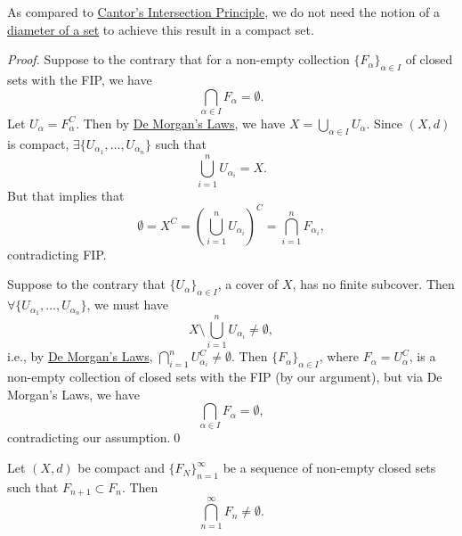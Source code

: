 \documentclass[notoc,notitlepage]{tufte-book}
\begin{document}
\begin{remark}
  As compared to \hyperref[thm:cantor_s_intersection_principle]{Cantor's Intersection Principle}, we do not need the notion of a \hyperref[defn:diameter_of_a_set]{diameter of a set} to achieve this result in a compact set.
\end{remark}

\begin{proof}
   Suppose to the contrary that for a non-empty collection $\{ F_\alpha \}_{\alpha \in I}$ of closed sets with the FIP, we have
  \begin{equation*}
    \bigcap_{\alpha \in I} F_\alpha = \emptyset.
  \end{equation*}
  Let $U_\alpha = F_\alpha^C$. Then by \hyperref[thm:de_morgan_s_laws]{De Morgan's Laws}, we have $X = \bigcup_{\alpha \in I} U_\alpha$. Since $(X, d)$ is compact, $\exists \{ U_{\alpha_1}, \ldots, U_{\alpha_n} \}$ such that
  \begin{equation*}
    \bigcup_{i=1}^{n} U_{\alpha_i} = X.
  \end{equation*}
  But that implies that
  \begin{equation*}
    \emptyset = X^C = \left( \bigcup_{i=1}^{n} U_{\alpha_i} \right)^C = \bigcap_{i=1}^{n} F_{\alpha_i},
  \end{equation*}
  contradicting FIP.

  \noindent
   Suppose to the contrary that $\{ U_\alpha \}_{\alpha \in I}$, a cover of $X$, has no finite subcover. Then $\forall \{ U_{\alpha_1}, \ldots, U_{\alpha_n} \}$, we must have
  \begin{equation*}
    X \setminus \bigcup_{i=1}^{n} U_{\alpha_i} \neq \emptyset,
  \end{equation*}
  i.e., by \hyperref[thm:de_morgan_s_laws]{De Morgan's Laws}, $\bigcap_{i=1}^{n} U_{\alpha_i}^C \neq \emptyset$. Then $\{ F_\alpha \}_{\alpha \in I}$, where $F_\alpha = U_\alpha^C$, is a non-empty collection of closed sets with the FIP (by our argument), but via De Morgan's Laws, we have
  \begin{equation*}
    \bigcap_{\alpha \in I} F_\alpha = \emptyset,
  \end{equation*}
  contradicting our assumption.\qed\
\end{proof}

\begin{crly}\label{crly:generalized_nested_interval_theorem_for_compact_metric_spaces}
  Let $(X, d)$ be compact and $\{ F_N \}_{n = 1}^{\infty}$ be a sequence of non-empty closed sets such that $F_{n + 1} \subset F_n$. Then
  \begin{equation*}
    \bigcap_{n=1}^{\infty} F_n \neq \emptyset.
  \end{equation*}
\end{crly}
\end{document}
